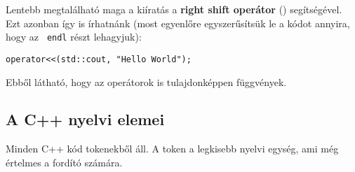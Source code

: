 \documentclass[a4paper,11.5pt,table]{article}
\begin{document}
	\medskip
	Lentebb megtalálható maga a kiíratás a \textbf{right shift operátor} (\texttt{\<}) segítségével. Ezt azonban így is írhatnánk (most egyenlőre egyszerűsítsük le a kódot annyira, hogy az \texttt{\< endl} részt lehagyjuk):
	\begin{lstlisting}
operator<<(std::cout, "Hello World");
	\end{lstlisting}
	Ebből látható, hogy az operátorok is tulajdonképpen függvények.
	\subsection{A C++ nyelvi elemei}
	Minden C++ kód tokenekből áll. A token a legkisebb nyelvi egység, ami még értelmes a fordító számára. %
	
\end{document}
